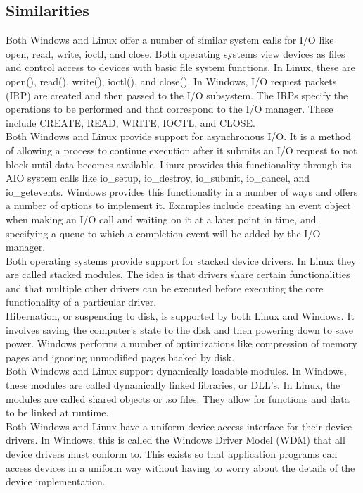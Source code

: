\documentclass[letterpaper,10pt,titlepage]{article}
\begin{document}
\subsection{Similarities}
Both Windows and Linux offer a number of similar system calls for I/O like 
open, read, write, ioctl, and close. Both operating systems view devices as 
files and control access to devices with basic file system functions. In 
Linux, these are open(), read(), write(), ioctl(), and close(). In Windows, 
I/O request packets (IRP) are created and then passed to the I/O subsystem. 
The IRPs specify the operations to be performed and that correspond to the 
I/O manager. These include CREATE, READ, WRITE, IOCTL, and CLOSE.
\\
\linebreak
Both Windows and Linux provide support for asynchronous I/O. It is a method of
allowing a process to continue execution after it submits an I/O request to 
not block until data becomes available. Linux provides this functionality 
through its AIO system calls like io\_setup, io\_destroy, io\_submit,
io\_cancel, and io\_getevents. Windows provides this functionality in a number
of ways and offers a number of options to implement it. Examples include 
creating an event object when making an I/O call and waiting on it at a later 
point in time, and specifying a queue to which a completion event will be 
added by the I/O manager.
\\
\linebreak
Both operating systems provide support for stacked device drivers. In Linux
they are called stacked modules. The idea is that drivers share certain 
functionalities and that multiple other drivers can be executed before 
executing the core functionality of a particular driver.
\\
\linebreak
Hibernation, or suspending to disk, is supported by both Linux and Windows.
It involves saving the computer's state to the disk and then powering down to
save power. Windows performs a number of optimizations like compression of 
memory pages and ignoring unmodified pages backed by disk.
\\
\linebreak
Both Windows and Linux support dynamically loadable modules. In Windows, these
modules are called dynamically linked libraries, or DLL's. In Linux, the 
modules are called shared objects or .so files. They allow for functions and 
data to be linked at runtime. 
\\
\linebreak
Both Windows and Linux have a uniform device access interface for their 
device drivers. In Windows, this is called the Windows Driver Model (WDM) 
that all device drivers must conform to. This exists so that application 
programs can access devices in a uniform way without having to worry about
the details of the device implementation. 
\end{document}
